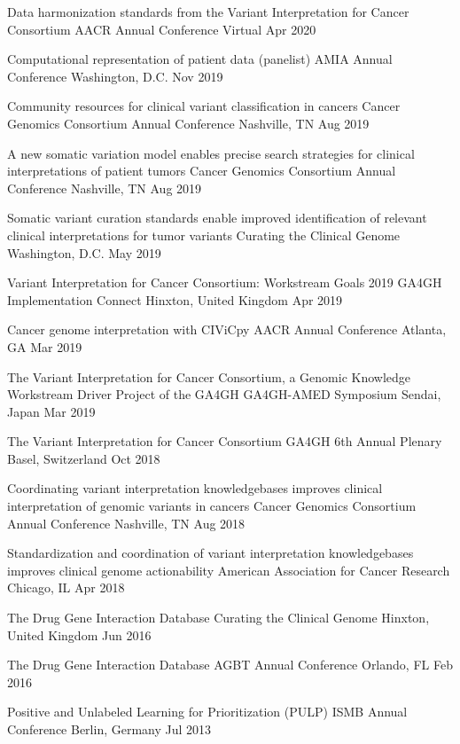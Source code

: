 \oral
{Data harmonization standards from the Variant Interpretation for Cancer Consortium}
{AACR Annual Conference}
{Virtual}
{Apr 2020}

\invited
{Computational representation of patient data (panelist)}
{AMIA Annual Conference}
{Washington, D.C.}
{Nov 2019}

\invited
{Community resources for clinical variant classification in cancers}
{Cancer Genomics Consortium Annual Conference}
{Nashville, TN}
{Aug 2019}

\oral
{A new somatic variation model enables precise search strategies for clinical interpretations of patient tumors}
{Cancer Genomics Consortium Annual Conference}
{Nashville, TN}
{Aug 2019}

\oral
{Somatic variant curation standards enable improved identification of relevant clinical interpretations for tumor variants}
{Curating the Clinical Genome}
{Washington, D.C.}
{May 2019}

\invited
{Variant Interpretation for Cancer Consortium: Workstream Goals 2019}
{GA4GH Implementation Connect}
{Hinxton, United Kingdom}
{Apr 2019}

\poster
{Cancer genome interpretation with CIViCpy}
{AACR Annual Conference}
{Atlanta, GA}
{Mar 2019}

\invited
{The Variant Interpretation for Cancer Consortium, a Genomic Knowledge Workstream Driver Project of the GA4GH}
{GA4GH-AMED Symposium}
{Sendai, Japan}
{Mar 2019}

\invited
{The Variant Interpretation for Cancer Consortium}
{GA4GH 6th Annual Plenary}
{Basel, Switzerland}
{Oct 2018}

\oral
{Coordinating variant interpretation knowledgebases improves clinical interpretation of genomic variants in cancers}
{Cancer Genomics Consortium Annual Conference}
{Nashville, TN}
{Aug 2018}

\poster
{Standardization and coordination of variant interpretation knowledgebases improves clinical genome actionability}
{American Association for Cancer Research}
{Chicago, IL}
{Apr 2018}

\poster
{The Drug Gene Interaction Database}
{Curating the Clinical Genome}
{Hinxton, United Kingdom}
{Jun 2016}

\poster
{The Drug Gene Interaction Database}
{AGBT Annual Conference}
{Orlando, FL}
{Feb 2016}

\poster
{Positive and Unlabeled Learning for Prioritization (PULP)}
{ISMB Annual Conference}
{Berlin, Germany}
{Jul 2013}

